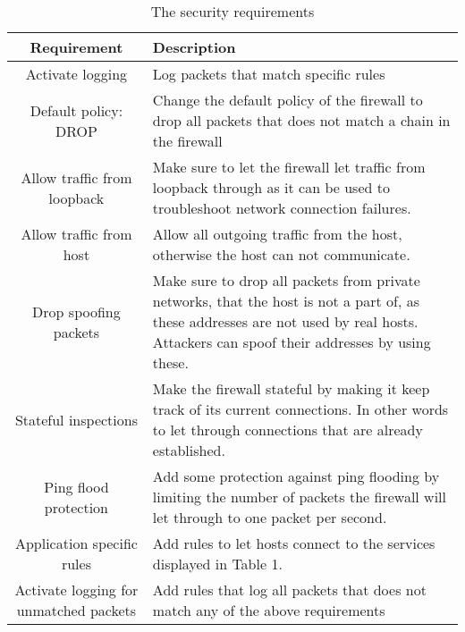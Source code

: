 \begin{table}[htp]
\renewcommand{\arraystretch}{1.5}
\centering
	\caption{The security requirements}
	\begin{tabular}{| c | p{8cm} | }
	\hline
	 Requirement & Description \\ \hline
	 Activate logging & Log packets that match specific rules \\
	 Default policy: DROP & Change the default policy of the firewall to drop all packets that does not match a chain in the firewall \\
	 Allow traffic from loopback & Make sure to let the firewall let traffic from loopback through as it can be used to troubleshoot network connection failures. \\
	 Allow traffic from host & Allow all outgoing traffic from the host, otherwise the host can not communicate. \\
	 Drop spoofing packets & Make sure to drop all packets from private networks, that the host is not a part of, as these addresses are not used by real hosts. Attackers can spoof their addresses by using these. \\
	 Stateful inspections & Make the firewall stateful by making it keep track of its current connections. In other words to let through connections that are already established. \\
	 Ping flood protection & Add some protection against ping flooding by limiting the number of packets the firewall will let through to one packet per second. \\ 
	 Application specific rules & Add rules to let hosts connect to the services displayed in Table 1. \\
	 Activate logging for unmatched packets & Add rules that log all packets that does not match any of the above requirements \\
	\hline
	\end{tabular}
	\label{Security requirements table}
\end{table}

